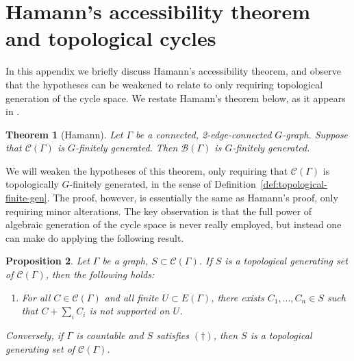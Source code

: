 \documentclass[11pt,a4paper]{amsart}
\newtheorem{theorem}{Theorem}[section]%
\newtheorem{proposition}[theorem]{Proposition}
\theoremstyle{definition}
\newcommand{\br}{{\mathscr{B}}}
\newcommand{\cyc}{\mathscr{C}}
\begin{document}
    




% 






\appendix





\section{Hamann's accessibility theorem and topological cycles}\label{app:hamann}

In this appendix we briefly discuss Hamann's accessibility theorem, and observe that the hypotheses can be weakened to relate to only requiring topological generation of the cycle space. We restate Hamann's theorem below, as it appears in \cite{hamann2018accessibility}. 

\begin{theorem}[Hamann]\label{thm:hamann}
    Let $\Gamma$ be a connected, 2-edge-connected $G$-graph. Suppose that $\cyc(\Gamma)$ is $G$-finitely generated. Then $\br(\Gamma)$ is $G$-finitely generated. 
\end{theorem}

We will weaken the hypotheses of this theorem, only requiring that $\cyc(\Gamma)$ is topologically $G$-finitely generated, in the sense of Definition~\ref{def:topological-finite-gen}. The proof, however, is essentially the same as Hamann's proof, only requiring minor alterations.
The key observation is that the full power of algebraic generation of the cycle space is never really employed, but instead one can make do applying the following result. 

\begin{proposition}\label{prop:top-gen-char}
    Let $\Gamma$ be a graph, $S \subset \cyc(\Gamma)$. If $S$ is a topological generating set of $\cyc(\Gamma)$, then the following holds:
    \begin{enumerate}
        \item[$(\dagger)$] For all $C \in \cyc(\Gamma)$ and all finite $U \subset E(\Gamma)$, there exists $C_1, \ldots, C_n \in S$ such that $C + \sum_i C_i$ is not supported on $U$.
    \end{enumerate}
    Conversely, if $\Gamma$ is countable and $S$ satisfies $(\dagger)$, then $S$ is a topological generating set of $\cyc(\Gamma)$.
\end{proposition}
\end{document}
